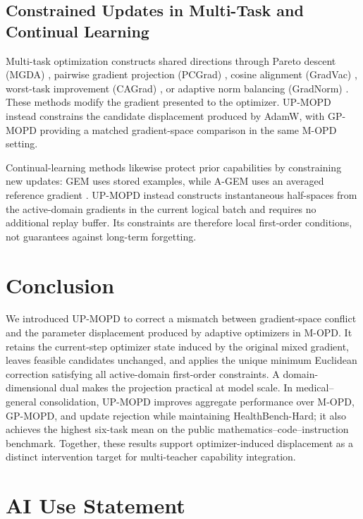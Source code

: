 \documentclass{article}
\begin{document}
\subsection{Constrained Updates in Multi-Task and Continual Learning}

Multi-task optimization constructs shared directions through Pareto descent
(MGDA) \citep{ref25}, pairwise gradient projection (PCGrad) \citep{ref26},
cosine alignment (GradVac) \citep{ref34}, worst-task improvement (CAGrad)
\citep{ref27}, or adaptive norm balancing (GradNorm) \citep{ref28}. These
methods modify the gradient presented to the optimizer. UP-MOPD instead
constrains the candidate displacement produced by AdamW, with GP-MOPD providing
a matched gradient-space comparison in the same M-OPD setting.

Continual-learning methods likewise protect prior capabilities by constraining
new updates: GEM uses stored examples, while A-GEM uses an averaged reference
gradient \citep{ref29,ref30}. UP-MOPD instead constructs instantaneous
half-spaces from the active-domain gradients in the current logical batch and
requires no additional replay buffer. Its constraints are therefore local
first-order conditions, not guarantees against long-term forgetting.

\section{Conclusion}

We introduced UP-MOPD to correct a mismatch between gradient-space conflict
and the parameter displacement produced by adaptive optimizers in M-OPD. It
retains the current-step optimizer state induced by the original mixed
gradient, leaves feasible candidates unchanged, and applies the unique minimum
Euclidean correction satisfying all active-domain first-order constraints. A
domain-dimensional dual makes the projection practical at model scale. In
medical--general consolidation, UP-MOPD improves aggregate performance over
M-OPD, GP-MOPD, and update rejection while maintaining HealthBench-Hard; it
also achieves the highest six-task mean on the public
mathematics--code--instruction benchmark. Together, these results support
optimizer-induced displacement as a distinct intervention target for
multi-teacher capability integration.

\section*{AI Use Statement}
\end{document}

